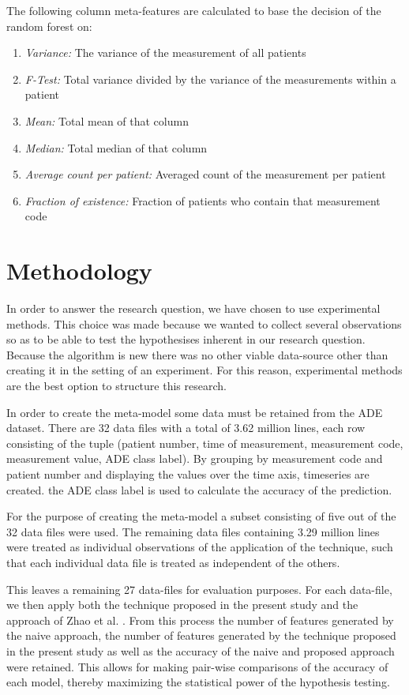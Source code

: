 \documentclass[conference]{IEEEtran}
\begin{document}
The following column meta-features are calculated to base the decision of the random forest on:
\begin{enumerate}
    \item \emph{Variance:} The variance of the measurement of all patients
    \item \emph{F-Test:} Total variance divided by the variance of the measurements within a patient 
    \item \emph{Mean:} Total mean of that column
    \item \emph{Median:} Total median of that column
    \item \emph{Average count per patient:} Averaged count of the measurement per patient
    \item \emph{Fraction of existence:} Fraction of patients who contain that measurement code
    
\end{enumerate}


\section{Methodology}


In order to answer the research question, we have chosen to use experimental methods. This choice was made because we wanted to collect several observations so as to be able to test the hypothesises inherent in our research question. Because the algorithm is new there was no other viable data-source other than creating it in the setting of an experiment. For this reason, experimental methods are the best option to structure this research.

In order to create the meta-model some data must be retained from the ADE dataset. There are 32 data files with a total of 3.62 million lines, each row consisting of the tuple (patient number, time of measurement, measurement code, measurement value, ADE class label). By grouping by measurement code and patient number and displaying the values over the time axis, timeseries are created. the ADE class label is used to calculate the accuracy of the prediction.

For the purpose of creating the meta-model a subset consisting of five out of the 32 data files were used. The remaining data files containing 3.29 million lines were treated as individual observations of the application of the technique, such that each individual data file is treated as independent of the others. 

This leaves a remaining 27 data-files for evaluation purposes. For each data-file, we then apply both the technique proposed in the present study and the approach of Zhao et al. \cite{zhao2014}. From this process the number of features generated by the naive approach, the number of features generated by the technique proposed in the present study as well as the accuracy of the naive and proposed approach were retained. This allows for making pair-wise comparisons of the accuracy of each model, thereby maximizing the statistical power of the hypothesis testing.
\end{document}
